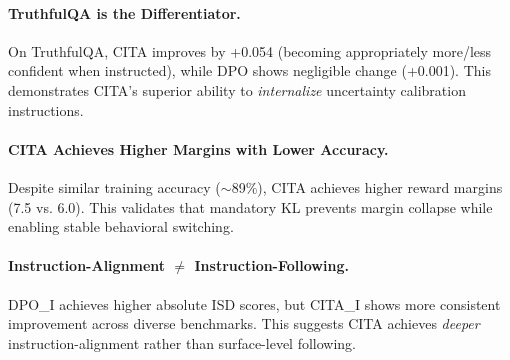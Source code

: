 \paragraph{TruthfulQA is the Differentiator.} On TruthfulQA, CITA improves by +0.054 (becoming appropriately more/less confident when instructed), while DPO shows negligible change (+0.001). This demonstrates CITA's superior ability to \textit{internalize} uncertainty calibration instructions.

\paragraph{CITA Achieves Higher Margins with Lower Accuracy.} Despite similar training accuracy ($\sim$89\%), CITA achieves higher reward margins (7.5 vs. 6.0). This validates that mandatory KL prevents margin collapse while enabling stable behavioral switching.

\paragraph{Instruction-Alignment $\neq$ Instruction-Following.} DPO\_I achieves higher absolute ISD scores, but CITA\_I shows more consistent improvement across diverse benchmarks. This suggests CITA achieves \textit{deeper} instruction-alignment rather than surface-level following.
